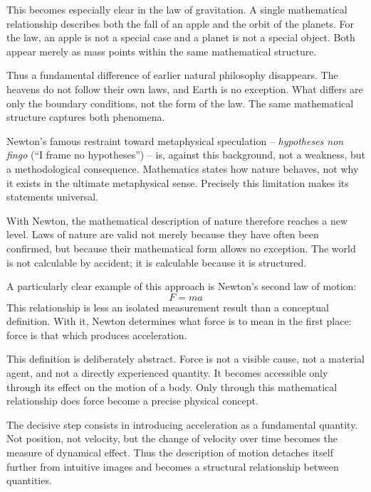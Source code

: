 This becomes especially clear in the law of gravitation.
A single mathematical relationship
describes both the fall of an apple
and the orbit of the planets.
For the law, an apple is not a special case
and a planet is not a special object.
Both appear merely as mass points
within the same mathematical structure.

Thus a fundamental difference of earlier natural philosophy disappears.
The heavens do not follow their own laws,
and Earth is no exception.
What differs
are only the boundary conditions,
not the form of the law.
The same mathematical structure captures both phenomena.

Newton's famous restraint toward metaphysical speculation --
\emph{hypotheses non fingo}
(``I frame no hypotheses'') --
is, against this background, not a weakness,
but a methodological consequence.
Mathematics states
how nature behaves,
not why it exists in the ultimate metaphysical sense.
Precisely this limitation makes its statements universal.

With Newton, the mathematical description of nature
therefore reaches a new level.
Laws of nature are valid not merely
because they have often been confirmed,
but because their mathematical form
allows no exception.
The world is not calculable by accident;
it is calculable
because it is structured.

A particularly clear example of this approach
is Newton's second law of motion:
\[
F = m a
\]
This relationship is less an isolated measurement result
than a conceptual definition.
With it, Newton determines
what force is to mean in the first place:
force is that which produces acceleration.

This definition is deliberately abstract.
Force is not a visible cause,
not a material agent,
and not a directly experienced quantity.
It becomes accessible only through its effect
on the motion of a body.
Only through this mathematical relationship
does force become a precise physical concept.

The decisive step consists in introducing
acceleration as a fundamental quantity.
Not position,
not velocity,
but the change of velocity over time
becomes the measure of dynamical effect.
Thus the description of motion
detaches itself further from intuitive images
and becomes a structural relationship between quantities.

